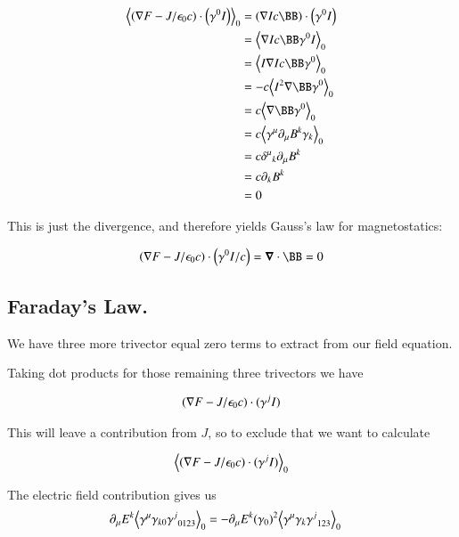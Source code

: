 \begin{align*}
\gpgradezero{\left(\grad F - J/\epsilon_0 c\right) \cdot \left(\gamma^0 I\right)}
&= (\grad I c \BB) \cdot \left(\gamma^0 I\right) \\
&= \gpgradezero{ \grad I c \BB \gamma^0 I } \\
&= \gpgradezero{ I \grad I c \BB \gamma^0 } \\
&= - c \gpgradezero{ I^2 \grad \BB \gamma^0 } \\
&= c \gpgradezero{ \grad \BB \gamma^0 } \\
&= c \gpgradezero{ \gamma^{\mu} \partial_{\mu} B^k \gamma_k } \\
&= c {\delta^{\mu}}_k \partial_{\mu} B^k \\
&= c \partial_{k} B^k \\
&= 0
\end{align*}

This is just the divergence, and therefore yields Gauss's law for magnetostatics:

\begin{equation}\label{eqn:vecMaxProj:gaussmagnet}
\left(\grad F - J/\epsilon_0 c\right) \cdot \left(\gamma^0 I / c \right) = \spacegrad \cdot \BB = 0
\end{equation}

\subsection{Faraday's Law. }

We have three more trivector equal zero terms to extract from our field equation.

Taking dot products for those remaining three trivectors we have

\begin{align*}
( \nabla F - J/\epsilon_0 c ) \cdot (\gamma^j I)
\end{align*}

This will leave a contribution from $J$, so to exclude that we want to calculate

\begin{align*}
{\left\langle{{( \nabla F - J/\epsilon_0 c ) \cdot (\gamma^j I)}}\right\rangle}_{0}
\end{align*}

The electric field contribution gives us
\begin{align*}
\partial_{\mu} E^k {\left\langle{{ \gamma^{\mu} \gamma_{k0} {\gamma^j}_{0123} }}\right\rangle}_{0} 
&=
-\partial_{\mu} E^k (\gamma_0)^2 {\left\langle{{ \gamma^{\mu} \gamma_{k} {\gamma^j}_{123} }}\right\rangle}_{0}
\end{align*}

